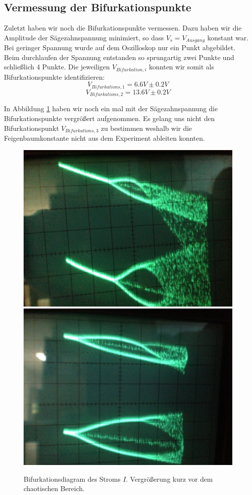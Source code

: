 \documentclass[12pt,a4paper]{article}
\begin{document}
\subsection { Vermessung der Bifurkationspunkte }
Zuletzt haben wir noch die Bifurkationspunkte vermessen. Dazu haben wir die Amplitude der Sägezahnspannung minimiert, so dass $V_s=V_{Ausgang}$ konstant war. Bei geringer Spannung wurde auf dem Oszilloskop nur ein Punkt abgebildet. Beim durchlaufen der Spannung entstanden so sprungartig zwei Punkte und schließlich 4 Punkte. Die jeweiligen $V_{Bifurkation, i}$ konnten wir somit als Bifurkationspunkte identifizieren: 
$$V_{Bifurkations, 1}=6.6V \pm 0.2V$$
$$V_{Bifurkations, 2}=13.6V \pm 0.2V$$

In Abbildung \ref{fig:ldr-bifurc-zoom} haben wir noch ein mal mit der Sägezahnspannung die Bifurkationspunkte vergrößert aufgenommen. Es gelang uns nicht den Bifurkationspunkt $V_{Bifurkations, 3}$ zu bestimmen weshalb wir die Feigenbaumkonstante nicht aus dem Experiment ableiten konnten.

\begin{figure}[!htbp]
\centering
\includegraphics[scale=0.18]{bif-ldr/bifurc-zoom}
\includegraphics[scale=0.18]{bif-ldr/bifurc-zoom2}
\caption{Bifurkationsdiagram des Stroms $I$. Vergrößerung kurz vor dem chaotischen Bereich.}
\label{fig:ldr-bifurc-zoom}
\end{figure}
\end{document}
